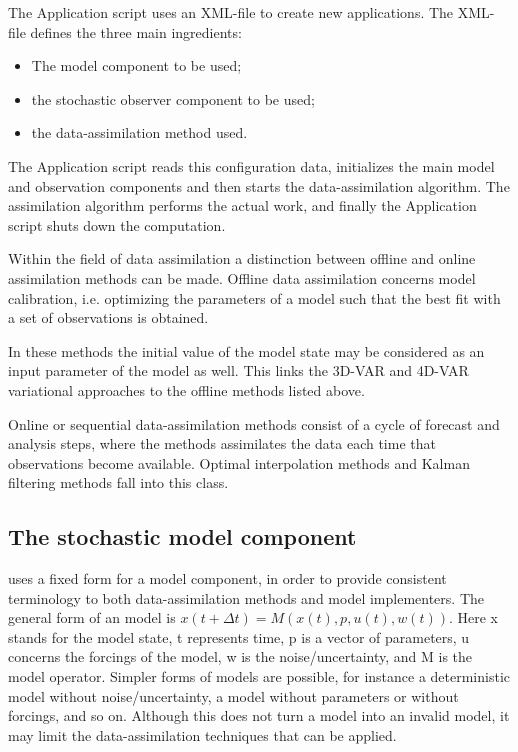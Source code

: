The \oda Application script uses an XML-file to create new \oda applications. The XML-file defines the three main ingredients:

\begin{itemize}
	\item The \oda model component to be used;
	\item the stochastic observer component to be used;
	\item the data-assimilation method used.
\end{itemize}

The \oda Application script reads this configuration data, initializes the main model and observation components and then starts the data-assimilation algorithm. The assimilation algorithm performs the actual work, and finally the Application script shuts down the computation.

Within the field of data assimilation a distinction between offline and online assimilation methods can be made. Offline data assimilation concerns model calibration, i.e. optimizing the parameters of a model such that the best fit with a set of observations is obtained.

In these methods the initial value of the model state may be considered as an input parameter of the model as well. This links the 3D-VAR and 4D-VAR variational approaches to the offline methods listed above.

Online or sequential data-assimilation methods consist of a cycle of forecast and analysis steps, where the methods assimilates the data each time that observations become available. Optimal interpolation methods and Kalman filtering methods fall into this class.

\subsection{The \oda stochastic model component}

\oda uses a fixed form for a model component, in order to provide consistent terminology to both data-assimilation methods and model implementers. The general form of an \oda model is
$x(t+\Delta t) = M(x(t), p, u(t), w(t))$.
Here x stands for the model state, t represents time, p is a vector of parameters, u concerns the forcings of the model, w is the noise/uncertainty, and M is the model operator. Simpler forms of models are possible, for instance a deterministic model without noise/uncertainty, a model without parameters or without forcings, and so on. Although this does not turn a model into an invalid \oda model, it may limit the data-assimilation techniques that can be applied.

